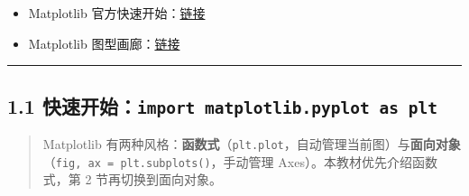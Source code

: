 \begin{itemize}
\tightlist
\item
  Matplotlib
  官方快速开始：\href{https://matplotlib.org/stable/tutorials/introductory/quick_start.html}{链接}
\item
  Matplotlib
  图型画廊：\href{https://matplotlib.org/stable/gallery/index.html}{链接}
\end{itemize}

\begin{center}\rule{0.5\linewidth}{0.5pt}\end{center}

\subsection{\texorpdfstring{1.1
快速开始：\texttt{import\ matplotlib.pyplot\ as\ plt}}{1.1 快速开始：import matplotlib.pyplot as plt}}\label{ux5febux901fux5f00ux59cbimport-matplotlib.pyplot-as-plt}

\begin{quote}
Matplotlib
有两种风格：\textbf{函数式}（\texttt{plt.plot}，自动管理当前图）与\textbf{面向对象}（\texttt{fig,\ ax\ =\ plt.subplots()}，手动管理
Axes）。本教材优先介绍函数式，第 2 节再切换到面向对象。
\end{quote}

\begin{Shaded}
\begin{Highlighting}[]

\NormalTok{plt.rcParams[}\NormalTok{] }\OperatorTok{=}\NormalTok{ [}\NormalTok{, }\NormalTok{, }\NormalTok{]}
\NormalTok{plt.rcParams[}\NormalTok{] }\OperatorTok{=} 
\OperatorTok{=}\OperatorTok{=}\NormalTok{)}

\OperatorTok{=}\NormalTok{ [}\NormalTok{, }\NormalTok{, }\NormalTok{, }\NormalTok{, }\NormalTok{]}
\OperatorTok{=}\NormalTok{ [}\NormalTok{, }\NormalTok{, }\NormalTok{, }\NormalTok{, }\NormalTok{]}

\NormalTok{)}
\NormalTok{)}
\NormalTok{)}
\end{Highlighting}
\end{Shaded}

